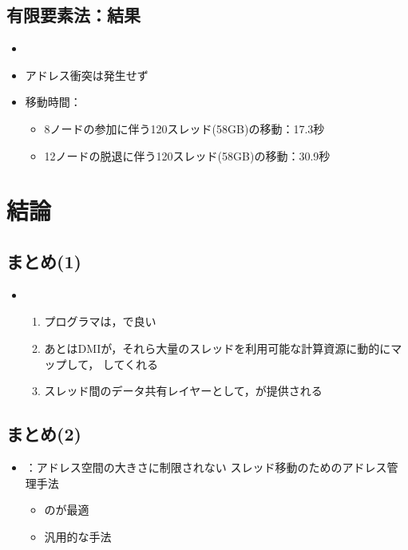 \documentclass[25pt,papersize,landscape]{jsarticle}
\begin{document}
\subsection{有限要素法：結果}

\begin{itemize}
\item {}
\item アドレス衝突は発生せず
\item 移動時間：
  \begin{itemize}
  \item 8ノードの参加に伴う120スレッド(58GB)の移動：17.3秒
  \item 12ノードの脱退に伴う120スレッド(58GB)の移動：30.9秒
  \end{itemize}
\end{itemize}

\section{結論}

\subsection{まとめ(1)}

\begin{itemize}
\item {}
  \begin{enumerate}
  \item プログラマは，で良い
  \item あとはDMIが，それら大量のスレッドを利用可能な計算資源に動的にマップして，
    してくれる
  \item スレッド間のデータ共有レイヤーとして，が提供される
  \end{enumerate}
\end{itemize}

\subsection{まとめ(2)}

\begin{itemize}
\item {}：アドレス空間の大きさに制限されない
スレッド移動のためのアドレス管理手法
  \begin{itemize}
  \item {}のが最適
  \item 汎用的な手法
  \end{itemize}
\end{itemize}
\end{document}
